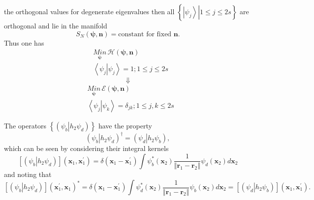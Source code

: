 \documentclass[aps,preprint]{revtex4}%
\begin{document}
the orthogonal values for degenerate eigenvalues then all $\left\{  \left.
\left\vert \psi_{j}\right\rangle \right\vert 1\leq j\leq2s\right\}  $ are
orthogonal and lie in the manifold
\begin{equation}
S_{N}\left(  \mathbf{\psi,n}\right)  =\text{constant for fixed }\mathbf{n.}%
\end{equation}
Thus one has
\begin{align}
&  \underset{\mathbf{\psi}}{Min}\,\mathcal{H}\left(  \mathbf{\psi,n}\right)
\\
&  \left\langle \left.  \psi_{j}\right\vert \psi_{j}\right\rangle =1;1\leq
j\leq2s
\end{align}%
\begin{equation}
\Downarrow
\end{equation}%
\begin{align}
&  \underset{\mathbf{\psi}}{Min}\,\mathcal{E}\left(  \mathbf{\psi,n}\right)
\\
&  \left\langle \left.  \psi_{j}\right\vert \psi_{k}\right\rangle =\delta
_{jk};1\leq j,k\leq2s
\end{align}


The operators $\left\{  \left(  \left.  \psi_{b}\right\vert h_{2}\psi
_{d}\right)  \right\}  $ have the property
\begin{equation}
\left(  \left.  \psi_{b}\right\vert h_{2}\psi_{d}\right)  ^{\dagger}=\left(
\left.  \psi_{d}\right\vert h_{2}\psi_{b}\right)  ,
\end{equation}
which can be seen by considering their integral kernels
\begin{equation}
\left[  \left(  \left.  \psi_{b}\right\vert h_{2}\psi_{d}\right)  \right]
\left(  \mathbf{x}_{1},\mathbf{x}_{1}^{\prime}\right)  =\delta\left(
\mathbf{x}_{1}-\mathbf{x}_{1}^{\prime}\right)  \int\psi_{b}^{\ast}\left(
\mathbf{x}_{2}\right)  \frac{1}{\left\Vert \mathbf{r}_{1}-\mathbf{r}%
_{2}\right\Vert }\psi_{d}\left(  \mathbf{x}_{2}\right)  d\mathbf{x}_{2}%
\end{equation}
and noting that
\begin{equation}
\left[  \left(  \left.  \psi_{b}\right\vert h_{2}\psi_{d}\right)  \right]
\left(  \mathbf{x}_{1}^{\prime},\mathbf{x}_{1}\right)  ^{\ast}=\delta\left(
\mathbf{x}_{1}-\mathbf{x}_{1}^{\prime}\right)  \int\psi_{d}^{\ast}\left(
\mathbf{x}_{2}\right)  \frac{1}{\left\Vert \mathbf{r}_{1}-\mathbf{r}%
_{2}\right\Vert }\psi_{b}\left(  \mathbf{x}_{2}\right)  d\mathbf{x}%
_{2}=\left[  \left(  \left.  \psi_{d}\right\vert h_{2}\psi_{b}\right)
\right]  \left(  \mathbf{x}_{1},\mathbf{x}_{1}^{\prime}\right)  .
\end{equation}
\end{document}

